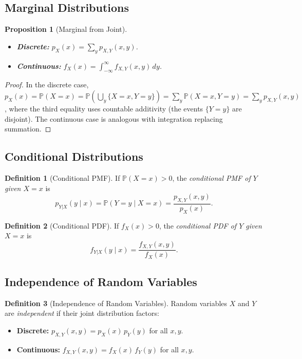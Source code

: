 \documentclass[11pt,a4paper]{article}
\theoremstyle{definition}
\newtheorem{definition}{Definition}[section]
\theoremstyle{plain}
\newtheorem{proposition}[theorem]{Proposition}
\theoremstyle{remark}
\newcommand{\Prob}{\mathbb{P}}
\begin{document}
\subsection{Marginal Distributions}

\begin{proposition}[Marginal from Joint]
\label{prop:marginals}
\begin{itemize}[nosep]
    \item \textbf{Discrete:} $p_X(x) = \sum_y p_{X,Y}(x,y)$.
    \item \textbf{Continuous:} $f_X(x) = \int_{-\infty}^\infty f_{X,Y}(x,y)\,dy$.
\end{itemize}
\end{proposition}

\begin{proof}
In the discrete case, $p_X(x) = \Prob(X = x) = \Prob\!\left(\bigcup_y \{X = x, Y = y\}\right)
= \sum_y \Prob(X = x, Y = y) = \sum_y p_{X,Y}(x,y)$, where the third equality uses
countable additivity (the events $\{Y = y\}$ are disjoint). The continuous case is analogous
with integration replacing summation.
\end{proof}

\subsection{Conditional Distributions}

\begin{definition}[Conditional PMF]
\label{def:cond_pmf}
If $\Prob(X = x) > 0$, the \emph{conditional PMF of $Y$ given $X = x$} is
\[
    p_{Y|X}(y \mid x) = \Prob(Y = y \mid X = x) = \frac{p_{X,Y}(x,y)}{p_X(x)}.
\]
\end{definition}

\begin{definition}[Conditional PDF]
\label{def:cond_pdf}
If $f_X(x) > 0$, the \emph{conditional PDF of $Y$ given $X = x$} is
\[
    f_{Y|X}(y \mid x) = \frac{f_{X,Y}(x,y)}{f_X(x)}.
\]
\end{definition}

\subsection{Independence of Random Variables}

\begin{definition}[Independence of Random Variables]
\label{def:indep_rv}
Random variables $X$ and $Y$ are \emph{independent} if their joint distribution factors:
\begin{itemize}[nosep]
    \item \textbf{Discrete:} $p_{X,Y}(x,y) = p_X(x)\,p_Y(y)$ for all $x, y$.
    \item \textbf{Continuous:} $f_{X,Y}(x,y) = f_X(x)\,f_Y(y)$ for all $x, y$.
\end{itemize}
\end{definition}
\end{document}
